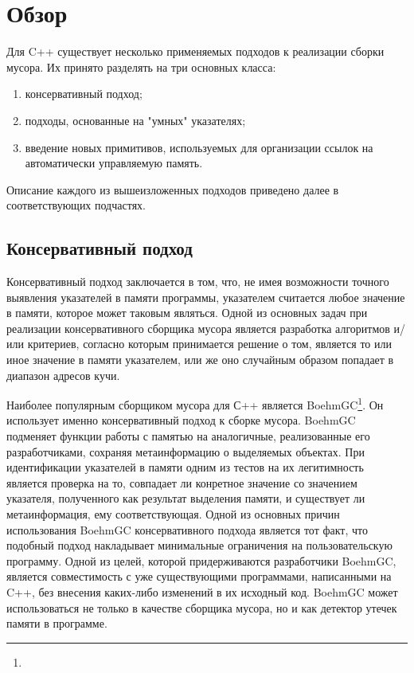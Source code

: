 \section{Обзор}

Для C++ существует несколько применяемых подходов к реализации сборки мусора.
Их принято разделять на три основных класса\cite{CppArt}:
\begin{enumerate}
\item консервативный подход;
\item подходы, основанные на "умных" указателях;
\item введение новых примитивов, используемых для организации ссылок на автоматически управляемую память.
\end{enumerate}
Описание каждого из вышеизложенных подходов приведено далее в соответствующих подчастях.

\subsection{Консервативный подход}
Консервативный подход заключается в том, что, не имея возможности точного выявления указателей в памяти программы,
указателем считается любое значение в памяти, которое может таковым являться.
Одной из основных задач при реализации консервативного сборщика мусора является разработка алгоритмов
и/или критериев, согласно которым принимается решение о том, является то или иное значение в памяти указателем,
или же оно случайным образом попадает в диапазон адресов кучи.

Наиболее популярным сборщиком мусора для С++ является BoehmGC\footnote{}.
Он использует именно консервативный подход к сборке мусора.
BoehmGC подменяет функции работы с памятью на аналогичные, реализованные его разработчиками,
сохраняя метаинформацию о выделяемых объектах.
При идентификации указателей в памяти одним из тестов на их легитимность является проверка
на то, совпадает ли конретное значение со значением указателя, полученного как результат
выделения памяти, и существует ли метаинформация, ему соответствующая.
Одной из основных причин использования BoehmGC консервативного подхода является тот факт,
что подобный подход накладывает минимальные ограничения на пользовательскую программу.
Одной из целей, которой придерживаются разработчики BoehmGC, является совместимость с уже существующими
программами, написанными на C++, без внесения каких-либо изменений в их исходный код\cite{BoehmTransGC}.
BoehmGC может использоваться не только в качестве сборщика мусора, но и как детектор утечек памяти в программе.

